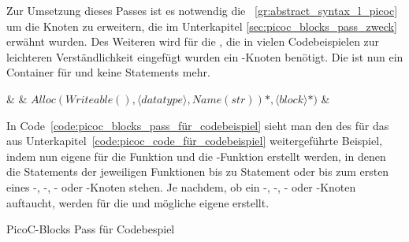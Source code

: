 
Zur Umsetzung dieses Passes ist es notwendig die ~\ref{gr:abstract_syntax_l_picoc} um die Knoten zu erweitern, die im Unterkapitel \ref{sec:picoc_blocks_pass_zweck} erwähnt wurden. Des Weiteren wird für die , die in vielen Codebeispielen zur leichteren Verständlichkeit eingefügt wurden ein -Knoten benötigt. Die   ist nun ein Container für   und keine Statements  mehr.

\begin{grammar}
  \toprule
  & & \qquad $Alloc(Writeable(), \langle datatype\rangle , Name(str))*, \langle block\rangle *)$ & \\
  \midrule
  \bottomrule
\end{grammar}


In Code~\ref{code:picoc_blocks_pass_für_codebeispiel} sieht man den  des  für das aus Unterkapitel~\ref{code:picoc_code_für_codebeispiel} weitergeführte Beispiel, indem nun eigene  für die Funktion  und die -Funktion erstellt werden, in denen die  Statements der jeweiligen Funktionen bis zu  Statement oder bis zum ersten  eines -, -, - oder -Knoten stehen. Je nachdem, ob ein -, -, - oder -Knoten auftaucht, werden für die  und mögliche  eigene  erstellt.

\begin{code}
  \centering
  \caption{PicoC-Blocks Pass für Codebespiel}
  \label{code:picoc_blocks_pass_für_codebeispiel}
\end{code}

